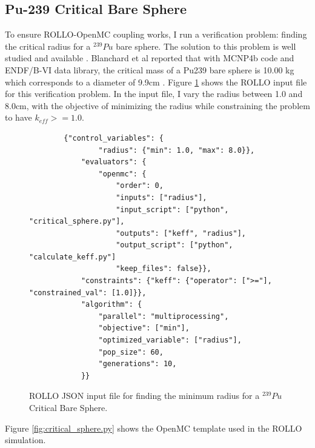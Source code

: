 \subsection{Pu-239 Critical Bare Sphere}
To ensure \gls{ROLLO}-OpenMC coupling works, I run a verification problem:
finding the critical radius for a $^{239}Pu$ bare sphere. 
The solution to this problem is well studied and available \cite{blanchard_updated_1999}. 
Blanchard et al reported that with MCNP4b code and ENDF/B-VI data library, the 
critical mass of a Pu239 bare sphere is 10.00 kg which corresponds to a diameter 
of 9.9cm \cite{blanchard_updated_1999}.
Figure \ref{fig:verification-sphere} shows the ROLLO input file for this verification 
problem. 
In the input file, I vary the radius between 1.0 and 8.0cm, with the objective of 
minimizing the radius while constraining the problem to have $k_{eff} >= 1.0$.
\begin{figure}[H]
    \begin{verbatim}
        {"control_variables": {
                "radius": {"min": 1.0, "max": 8.0}},
            "evaluators": {
                "openmc": {
                    "order": 0, 
                    "inputs": ["radius"],
                    "input_script": ["python", "critical_sphere.py"],
                    "outputs": ["keff", "radius"],
                    "output_script": ["python", "calculate_keff.py"]
                    "keep_files": false}},
            "constraints": {"keff": {"operator": [">="], "constrained_val": [1.0]}},
            "algorithm": {
                "parallel": "multiprocessing",
                "objective": ["min"],
                "optimized_variable": ["radius"],
                "pop_size": 60, 
                "generations": 10,
            }}
    \end{verbatim}
    \caption{\acrfull{ROLLO} JSON input file for finding the minimum radius for 
    a $^{239}Pu$ Critical Bare Sphere.}
    \label{fig:verification-sphere}
\end{figure}
\pagebreak
Figure \ref{fig:critical_sphere.py} shows the OpenMC template used in the 
\gls{ROLLO} simulation. 
